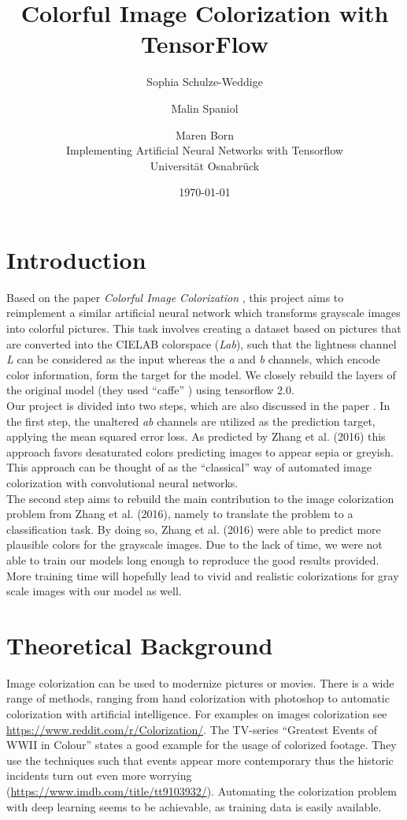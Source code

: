 \documentclass[12pt,letterpaper]{article}
\title{Colorful Image Colorization with TensorFlow}
\date{\today}
\author{Sophia Schulze-Weddige \and Malin Spaniol \and Maren Born \\Implementing Artificial Neural Networks with Tensorflow \\Universität Osnabrück}
\begin{document}
\maketitle
\thispagestyle{empty}
\newpage
\thispagestyle{empty}
\tableofcontents
\newpage
\section{Introduction}
Based on the paper \emph{Colorful Image Colorization} \citep{Zhang.2016}, this project aims to reimplement a similar artificial neural network which transforms grayscale images into colorful pictures. This task involves creating a dataset based on pictures that are converted into the CIELAB colorspace (\emph{Lab}), such that the lightness channel \emph{L} can be considered as the input whereas the \emph{a} and \emph{b} channels, which encode color information, form the target for the model. We closely rebuild the layers of the original model (they used \enquote{caffe} \citep{jia2014caffe}) using tensorflow 2.0.\\
Our project is divided into two steps, which are also discussed in the paper \citep{Zhang.2016}. In the first step, the unaltered \emph{ab} channels are utilized as the prediction target, applying the mean squared error loss. As predicted by Zhang et al. (2016) this approach favors desaturated colors predicting images to appear sepia or greyish. This approach can be thought of as the \enquote{classical} way of automated image colorization with convolutional neural networks.\\
The second step aims to rebuild the main contribution to the image colorization problem from Zhang et al. (2016), namely to translate the problem to a classification task. By doing so, Zhang et al. (2016) were able to predict more plausible colors for the grayscale images. Due to the lack of time, we were not able to train our models long enough to reproduce the good results provided. More training time will hopefully lead to vivid and realistic colorizations for gray scale images with our model as well.

\section{Theoretical Background}
Image colorization can be used to modernize pictures or movies. There is a wide range of methods, ranging from hand colorization with photoshop to automatic colorization with artificial intelligence. For examples on images colorization see \url{https://www.reddit.com/r/Colorization/}. The TV-series \enquote{Greatest Events of WWII in Colour} states a good example for the usage of colorized footage. They use the techniques such that events appear more contemporary thus the historic incidents turn out even more worrying (\url{https://www.imdb.com/title/tt9103932/}). 
Automating the colorization problem with deep learning seems to be achievable, as training data is easily available.
\end{document}
